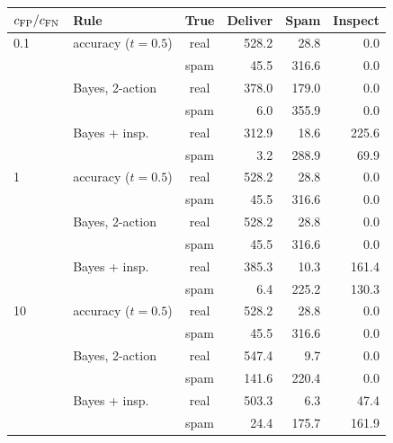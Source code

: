 \begin{tabular}{llcrrr}
\toprule
$c_{\mathrm{FP}}/c_{\mathrm{FN}}$ & Rule & True & Deliver & Spam & Inspect \\
\midrule
0.1 & accuracy ($t=0.5$) & real & 528.2 & 28.8 & 0.0 \\
 &  & spam & 45.5 & 316.6 & 0.0 \\
 & Bayes, 2-action & real & 378.0 & 179.0 & 0.0 \\
 &  & spam & 6.0 & 355.9 & 0.0 \\
 & Bayes + insp. & real & 312.9 & 18.6 & 225.6 \\
 &  & spam & 3.2 & 288.9 & 69.9 \\
\midrule
1 & accuracy ($t=0.5$) & real & 528.2 & 28.8 & 0.0 \\
 &  & spam & 45.5 & 316.6 & 0.0 \\
 & Bayes, 2-action & real & 528.2 & 28.8 & 0.0 \\
 &  & spam & 45.5 & 316.6 & 0.0 \\
 & Bayes + insp. & real & 385.3 & 10.3 & 161.4 \\
 &  & spam & 6.4 & 225.2 & 130.3 \\
\midrule
10 & accuracy ($t=0.5$) & real & 528.2 & 28.8 & 0.0 \\
 &  & spam & 45.5 & 316.6 & 0.0 \\
 & Bayes, 2-action & real & 547.4 & 9.7 & 0.0 \\
 &  & spam & 141.6 & 220.4 & 0.0 \\
 & Bayes + insp. & real & 503.3 & 6.3 & 47.4 \\
 &  & spam & 24.4 & 175.7 & 161.9 \\
\bottomrule
\end{tabular}
